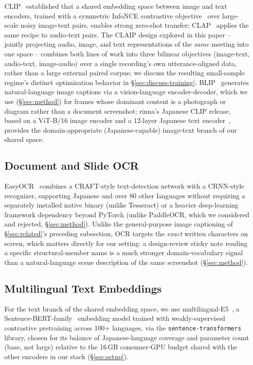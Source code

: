 ﻿\documentclass[twocolumn]{article}
\begin{document}
CLIP~\cite{radford2021clip} established that a shared embedding space between image and text
encoders, trained with a symmetric InfoNCE contrastive objective~\cite{oord2018cpc} over large-scale
noisy image-text pairs, enables strong zero-shot transfer; CLAP~\cite{elizalde2023clap} applies the
same recipe to audio-text pairs. The CLAIP design explored in this paper -- jointly projecting
audio, image, and text representations of the \emph{same} meeting into one space -- combines both
lines of work into three bilinear objectives (image-text, audio-text, image-audio) over a single
recording's own utterance-aligned data, rather than a large external paired corpus; we discuss the
resulting small-sample regime's distinct optimization behavior in \S\ref{sec:discuss-training}.
BLIP~\cite{li2022blip} generates natural-language image captions via a vision-language
encoder-decoder, which we use (\S\ref{sec:method}) for frames whose dominant content is a
photograph or diagram rather than a document screenshot; rinna's Japanese CLIP release, based on a
ViT-B/16 image encoder and a 12-layer Japanese text encoder~\cite{sawada2024release}, provides the
domain-appropriate (Japanese-capable) image-text branch of our shared space.

\subsection{Document and Slide OCR}

EasyOCR~\cite{jaided2020easyocr} combines a CRAFT-style text-detection network with a CRNN-style
recognizer, supporting Japanese and over 80 other languages without requiring a separately installed
native binary (unlike Tesseract) or a heavier deep-learning framework dependency beyond
PyTorch (unlike PaddleOCR, which we considered and rejected, \S\ref{sec:method}). Unlike the
general-purpose image captioning of \S\ref{sec:related}'s preceding subsection, OCR targets the
\emph{exact} written characters on screen, which matters directly for our setting: a design-review
sticky note reading a specific structural-member name is a much stronger domain-vocabulary signal
than a natural-language scene description of the same screenshot (\S\ref{sec:method}).

\subsection{Multilingual Text Embeddings}

For the text branch of the shared embedding space, we use multilingual-E5~\cite{wang2024e5}, a
Sentence-BERT-family~\cite{reimers2019sentencebert} embedding model trained with weakly-supervised
contrastive pretraining across 100+ languages, via the \texttt{sentence-transformers} library,
chosen for its balance of Japanese-language coverage and parameter count (base, not large) relative
to the 16\,GB consumer-GPU budget shared with the other encoders in our stack
(\S\ref{sec:setup}).
\end{document}
